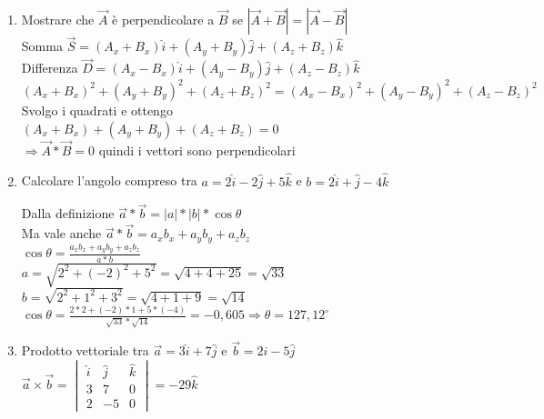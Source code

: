 \documentclass{report}
\begin{document}
\begin{enumerate}
  \item Mostrare che $\vec{A}$ è perpendicolare a $\vec{B}$ se $|\vec{A}+\vec{B}|=|\vec{A}-\vec{B}|$\\
        Somma $\vec{S}=(A_x+B_x)\hat{i}+(A_y+B_y)\hat{j}+(A_z+B_z)\hat{k}$\\
        Differenza $\vec{D}=(A_x-B_x)\hat{i}+(A_y-B_y)\hat{j}+(A_z-B_z)\hat{k}$\\
        $(A_x+B_x)^2+(A_y+B_y)^2+(A_z+B_z)^2=(A_x-B_x)^2+(A_y-B_y)^2+(A_z-B_z)^2$\\
        Svolgo i quadrati e ottengo\\
        $(A_x+B_x)+(A_y+B_y)+(A_z+B_z)=0$\\
        $\Rightarrow \vec{A}* \vec{B}=0$ quindi i vettori sono perpendicolari
  \item Calcolare l'angolo compreso tra $a=2\hat{i}-2\hat{j}+5\hat{k}$ e $b=2\hat{i}+\hat{j}-4\hat{k}$

        \begin{figure}[!ht]
          \centering

        \end{figure}

        Dalla definizione $\vec{a}*\vec{b}=|a|*|b|*\cos\theta$\\
        Ma vale anche $\vec{a}*\vec{b}=a_xb_x+a_yb_y+a_zb_z$\\
        $\cos\theta=\frac{a_xb_x+a_yb_y+a_zb_z}{a*b}$\\
        $a=\sqrt{2^2+(-2)^2+5^2}=\sqrt{4+4+25}=\sqrt{33}$\\
        $b=\sqrt{2^2+1^2+3^2}=\sqrt{4+1+9}=\sqrt{14}$\\
        $\cos\theta=\frac{2*2+(-2)*1+5*(-4)}{\sqrt{33}*\sqrt{14}}=-0,605 \Rightarrow \theta=127,12^{\circ}$
  \item Prodotto vettoriale tra $\vec{a}=3\hat{i}+7\hat{j}$ e $\vec{b}=2\hat{i}-5\hat{j}$\\
        $\vec{a}\times\vec{b}=\begin{vmatrix}
            \hat{i} & \hat{j} & \hat{k} \\
            3       & 7       & 0       \\
            2       & -5      & 0
          \end{vmatrix}=-29\hat{k}$
\end{enumerate}
\end{document}

